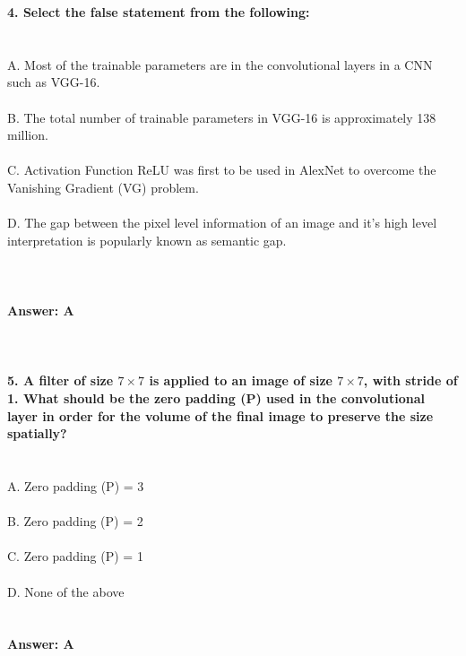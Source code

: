 \documentclass[prl,twocolumn,showpacs,preprintnumbers,superscriptaddress]{revtex4}
\theoremstyle{plain}
\theoremstyle{definition}
\begin{document}
\begin{widetext}
\textbf{4. Select the false statement from the following:}
\\
\\
\\
A. Most of the trainable parameters are in the convolutional layers in a CNN such as VGG-16.
\\
\\
B. The total number of trainable parameters in VGG-16 is approximately 138 million.
\\
\\
C. Activation Function ReLU was first to be used in AlexNet to overcome the Vanishing Gradient (VG) problem.
\\
\\
D. The gap between the pixel level information of an image and it's high level interpretation is popularly known as semantic gap.
\\
\\
\\
\\
\textbf{Answer: A}
\\
\\
\\
\\
\textbf{5. A filter of size $7 \times 7$ is applied to an image of size $7 \times 7$, with stride of 1. What should be the zero padding (P) used in the convolutional layer in order for the volume of the final image to preserve the size spatially?}
\\
\\
\\
A. Zero padding (P) = 3
\\
\\
B. Zero padding (P) = 2
\\
\\
C. Zero padding (P) = 1
\\
\\
D. None of the above
\\
\\
\\
\textbf{Answer: A}
\\
\\
\\
\\
\\
\\
\end{widetext}
\end{document}
